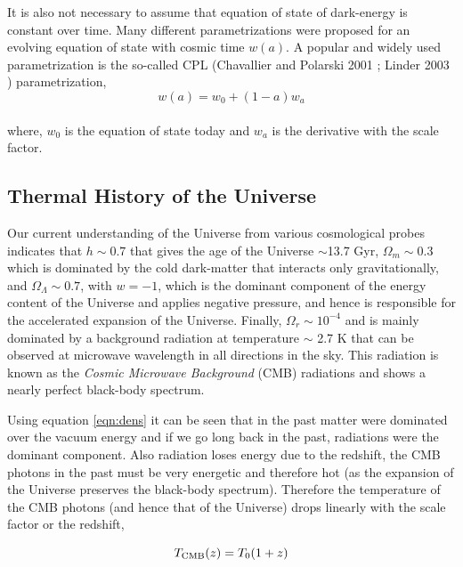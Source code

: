 It is also not necessary to assume that equation of state of dark-energy
is constant over time. Many different parametrizations were proposed
for an evolving equation of state with cosmic time $w(a)$. A popular
and widely used parametrization is the so-called CPL (Chavallier and Polarski
2001 \cite{2001IJMPD..10..213C}; Linder 2003 \citep{2003PhRvL..90i1301L}) parametrization,
\begin{equation}
	w(a) = w_0 + (1-a)w_a
\end{equation}
\\
where, $w_0$ is the equation of state today and $w_a$ is the derivative with
the scale factor. 

\subsection{Thermal History of the Universe}

Our current understanding of the Universe from various cosmological probes 
indicates that $h \sim 0.7$ that gives the
age of the Universe $\sim$13.7 Gyr, $\Omega_m \sim 0.3$ which is dominated
by the cold dark-matter that interacts only gravitationally, and 
$\Omega_{\Lambda} \sim 0.7$, with $w=-1$, 
which is the dominant component of the energy
content of the Universe and applies negative pressure, and hence is responsible
for the accelerated expansion of the Universe. Finally, $\Omega_r \sim 10^{-4}$
and is mainly dominated by a background radiation at temperature $\sim$ 2.7 K that
can be observed at microwave wavelength in all directions in the sky. This radiation is
known as the {\it Cosmic Microwave Background} (CMB) radiations and shows a nearly
perfect black-body spectrum.

Using equation \ref{eqn:dens}
it can be seen that in the past matter were dominated over the vacuum 
energy and if we go long back in the past, radiations were the dominant 
component. Also  radiation loses energy due 
to the redshift, the CMB photons in the past must be very energetic and
therefore hot (as the expansion of the Universe preserves the black-body 
spectrum). Therefore the temperature of the CMB photons (and hence that 
of the Universe) drops linearly with the scale factor or the redshift,

\begin{equation}
	T_{\rm CMB}(z) = T_0(1+z)
\end{equation}

